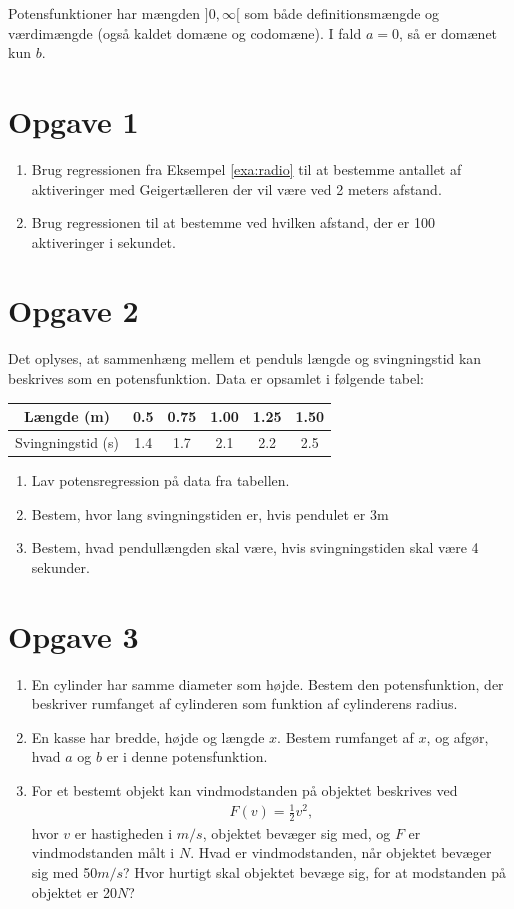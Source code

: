 Potensfunktioner har mængden $]0,\infty[$ som både definitionsmængde og værdimængde (også kaldet domæne og codomæne). I fald $a = 0$, så er domænet kun $b$. 

\section*{Opgave 1}
\begin{enumerate}[label=\roman*)]
\item Brug regressionen fra Eksempel \ref{exa:radio} til at bestemme antallet af aktiveringer med Geigertælleren der vil være ved 2 meters afstand.
\item Brug regressionen til at bestemme ved hvilken afstand, der er 100 aktiveringer i sekundet. 
\end{enumerate}
\section*{Opgave 2}
Det oplyses, at sammenhæng mellem et penduls længde og svingningstid kan beskrives som en potensfunktion. Data er opsamlet i følgende tabel:

\begin{center}\begin{tabular}{c|c|c|c|c|c}
Længde (m)& 0.5 & 0.75 & 1.00 & 1.25 & 1.50\\ \hline
Svingningstid (s) & 1.4 & 1.7 & 2.1 & 2.2 & 2.5 
\end{tabular}
\end{center}
\begin{enumerate}[label=\roman*)]
\item Lav potensregression på data fra tabellen. 
\item Bestem, hvor lang svingningstiden er, hvis pendulet er 3m
\item Bestem, hvad pendullængden skal være, hvis svingningstiden skal være 4 sekunder. 
\end{enumerate}
\section*{Opgave 3}
\begin{enumerate}[label=\roman*)]
\item En cylinder har samme diameter som højde. Bestem den potensfunktion, der beskriver rumfanget af cylinderen som funktion af cylinderens radius. 
\item En kasse har bredde, højde og længde $x$. Bestem rumfanget af $x$, og afgør, hvad $a$ og $b$ er i denne potensfunktion.
\item For et bestemt objekt kan vindmodstanden på objektet beskrives ved 
\begin{align*}
F(v)= \frac{1}{2}v^2,
\end{align*}
hvor $v$ er hastigheden i $m/s$, objektet bevæger sig med, og $F$ er vindmodstanden målt i $N$. Hvad er vindmodstanden, når objektet bevæger sig med 50$m/s$? Hvor hurtigt skal objektet bevæge sig, for at modstanden på objektet er 20$N$?

\end{enumerate}